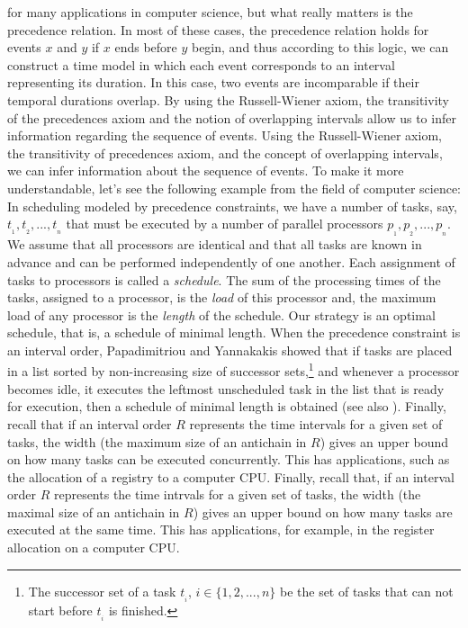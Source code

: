 \documentclass{article}
\theoremstyle{definition}
\begin{document}
for many applications in computer science, but what really matters is the precedence relation.
In most of these cases, the precedence relation holds for events $x$ and $y$ if $x$ ends before $y$ begin, 
and thus according to this logic, we can construct a time model in which each event corresponds to an interval representing its duration.
In this case,
two events are incomparable if their temporal durations overlap. 
By using
the Russell-Wiener axiom,
the transitivity of the precedences   
axiom and the notion of overlapping intervals allow us to infer information regarding the sequence of events. 
Using the Russell-Wiener axiom, the transitivity of precedences axiom, 
and the concept of overlapping intervals, we can infer information about the sequence of events.
To make it more understandable, let's see the following example from the field of computer science:
In scheduling 
modeled by precedence constraints,
we have a number of tasks, say,  $t_{_1}, t_{_2},...,t_{_n}$ that must be executed by a number of parallel 
processors $p_{_1}, p_{_2},...,p_{_n}$.  
We assume that all processors are identical and that all tasks are known 
in advance and can be performed independently of one another.
Each assignment of tasks to processors is called a {\it schedule}. 
The sum of the processing times of the
tasks, assigned to a processor, is the {\it load} of this processor and,  the maximum load of any processor is the {\it length}
 of the schedule.
Our
strategy is an optimal schedule, that is, a schedule of minimal length.
When the precedence constraint is an interval order,
Papadimitriou and Yannakakis \cite{PY} showed that if tasks are placed in a list sorted by 
non-increasing size of successor sets,\footnote{The successor set of a task $t_{_i}$, $i\in \{1,2,...,n\}$ be the set of tasks that can not start before $t_{_i}$ is finished.}
and whenever a processor becomes idle, it executes the leftmost unscheduled task in the list that is ready for execution, then 
a schedule of minimal length is obtained (see also \cite[Page 3]{sta}).
Finally, recall that if an interval order $R$ represents the time intervals for a given set of tasks, the width 
(the maximum size of an antichain in $R$) gives an upper bound on how many tasks can be executed concurrently. 
This has applications, such as the allocation of a registry to a computer CPU.
Finally,
recall that, if an interval order $R$ represents the time intrvals for a given set of tasks, the width (the maximal size of an antichain in $R$) gives an upper bound on how many tasks are executed at the same time. This has applications, 
for example, in the register allocation on a computer CPU. 
\end{document}
